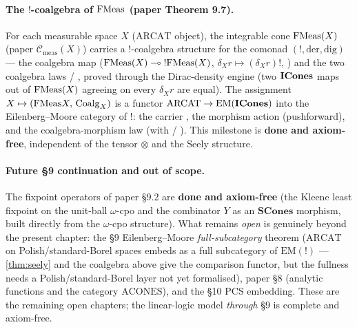 \paragraph{The \texorpdfstring{$\mathord{!}$}{!}-coalgebra of \texorpdfstring{$\mathrm{FMeas}$}{FMeas} (paper Theorem 9.7).}
For each measurable space $X$ ($\mathrm{ARCAT}$ object), the integrable
cone $\mathrm{FMeas}(X)$ (paper $\mathcal{C}_{\mathrm{meas}}(X)$) carries a
$\mathord{!}$-coalgebra structure for the comonad $(\mathord{!},
\mathrm{der}, \mathrm{dig})$ --- the coalgebra map
 ($\mathrm{FMeas}(X) \multimap \mathord{!}\mathrm{FMeas}(X)$,
$\delta_X r \mapsto (\delta_X r)!$, )
and the two coalgebra laws  /
, proved through the
Dirac-density engine  (two
$\mathbf{ICones}$ maps out of $\mathrm{FMeas}(X)$ agreeing on every $\delta_X r$ are
equal). The assignment $X \mapsto (\mathrm{FMeas} X,\,\mathrm{Coalg}_X)$ is a
functor $\mathrm{ARCAT} \to \mathrm{EM}(\mathbf{ICones})$ into the
Eilenberg–Moore category of $\mathord{!}$: the carrier
, the morphism action
 (pushforward), and the
coalgebra-morphism law 
(with  /
). This milestone is
\textbf{done and axiom-free}, independent of the tensor $\otimes$ and the
Seely structure.

\paragraph{Future \S9 continuation and out of scope.}
The fixpoint operators of paper \S9.2 are \textbf{done and axiom-free}
(the Kleene least fixpoint on the unit-ball $\omega$-cpo and the
combinator $Y$ as an $\mathbf{SCones}$ morphism, built directly from the
$\omega$-cpo structure). What remains \emph{open} is genuinely beyond
the present chapter: the \S9 Eilenberg–Moore \emph{full-subcategory}
theorem ($\mathrm{ARCAT}$ on Polish/standard-Borel spaces embeds as a
full subcategory of $\mathrm{EM}(\mathord{!})$ --- \autoref{thm:seely}
and the coalgebra above give the comparison functor, but the fullness
needs a Polish/standard-Borel layer not yet formalised), paper \S8
(analytic functions and the category $\mathrm{ACONES}$), and the \S10
PCS embedding. These are the remaining open chapters; the linear-logic
model \emph{through} \S9 is complete and axiom-free.
